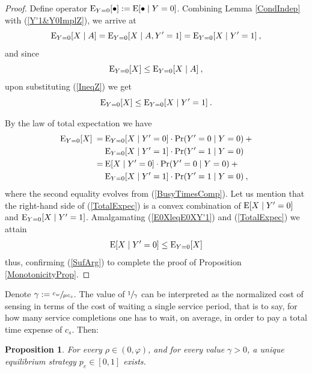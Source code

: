 \documentclass[11pt]{article}
\numberwithin{equation}{section}
\newtheorem{proposition}{Proposition}[section]
\newcommand{\e}{{\rm E}}
\begin{document}
\begin{proof}
Define operator $\e_{Y=0}[\bullet] := \e[\bullet \mid Y=0]$.
Combining Lemma \ref{CondIndep} with (\ref{Y'1&Y0ImplZ}), we arrive at
\begin{equation}
\e_{Y=0}[X \mid A] = \e_{Y=0}[X \mid A , Y'=1] = \e_{Y=0}[X \mid Y'=1] \:, \label{IneqZ}
\end{equation}
and since
\[ \e_{Y=0}[X] \leq \e_{Y=0}[X \mid A] \:,\]
upon substituting (\ref{IneqZ}) we get
\begin{equation}
\e_{Y=0}[X] \leq \e_{Y=0}[X \mid Y'=1] \:. \label{E0XleqE0XY'1}
\end{equation}

By the law of total expectation we have
\begin{equation}
\begin{split}
\e_{Y=0}[X] \: = \: & \e_{Y=0}[X \mid Y' = 0]\cdot \Pr(Y' = 0 \mid Y=0) \: +\\ 
& \e_{Y=0}[X \mid Y' = 1]\cdot \Pr(Y' = 1 \mid Y=0) \\
= \: & \e[X \mid Y' = 0]\cdot \Pr(Y' = 0 \mid Y=0) \: +\\ 
& \e_{Y=0}[X \mid Y' = 1]\cdot \Pr(Y' = 1 \mid Y=0)
\:, \label{TotalExpec}
\end{split}
\end{equation}
where the second equality evolves from (\ref{BusyTimesComp}). Let us mention that the right-hand side of (\ref{TotalExpec}) is a convex combination of $\e[X \mid Y' = 0]$ and $\e_{Y=0}[X \mid Y' = 1]$. Amalgamating (\ref{E0XleqE0XY'1}) and (\ref{TotalExpec}) we attain
\[ \e[X \mid Y'=0] \leq \e_{Y=0}[X] \]
thus, confirming (\ref{SufArg}) to complete the proof of Proposition \ref{MonotonicityProp}.
\end{proof}

Denote $\gamma :=\sfrac{c_{w}}{\mu c_{s}}$. The value of $\sfrac{1}{\gamma}$ can be interpreted as the normalized cost of sensing in terms of the cost of waiting a single service period, that is to say, for how many service completions one has to wait, on average, in order to pay a total time expense of $c_{s}$. Then:

\begin{proposition} For every $\rho\in(0,\varphi)$, and for every value $\gamma>0$, a unique equilibrium strategy $p_{e}\in[0,1]$ exists.
\end{proposition}
\end{document}

